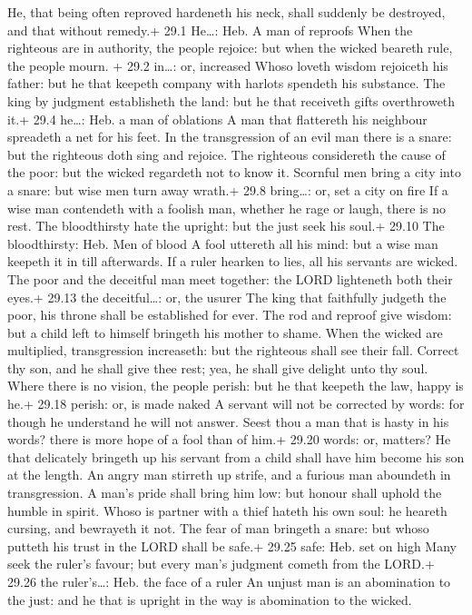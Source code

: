  He, that being often reproved hardeneth his neck, shall
suddenly be destroyed, and that without remedy.+ 29.1 He\ldots: Heb. A
man of reproofs  When the righteous are in authority, the
people rejoice: but when the wicked beareth rule, the people mourn. +
29.2 in\ldots: or, increased  Whoso loveth wisdom rejoiceth
his father: but he that keepeth company with harlots spendeth his
substance.  The king by judgment establisheth the land: but
he that receiveth gifts overthroweth it.+ 29.4 he\ldots: Heb. a man of
oblations  A man that flattereth his neighbour spreadeth a
net for his feet.  In the transgression of an evil man there
is a snare: but the righteous doth sing and rejoice.  The
righteous considereth the cause of the poor: but the wicked regardeth
not to know it.  Scornful men bring a city into a snare: but
wise men turn away wrath.+ 29.8 bring\ldots: or, set a city on fire
 If a wise man contendeth with a foolish man, whether he
rage or laugh, there is no rest.  The bloodthirsty hate the
upright: but the just seek his soul.+ 29.10 The bloodthirsty: Heb. Men
of blood  A fool uttereth all his mind: but a wise man
keepeth it in till afterwards.  If a ruler hearken to lies,
all his servants are wicked.  The poor and the deceitful
man meet together: the LORD lighteneth both their eyes.+ 29.13 the
deceitful\ldots: or, the usurer  The king that faithfully
judgeth the poor, his throne shall be established for ever.
 The rod and reproof give wisdom: but a child left to
himself bringeth his mother to shame.  When the wicked are
multiplied, transgression increaseth: but the righteous shall see their
fall.  Correct thy son, and he shall give thee rest; yea,
he shall give delight unto thy soul.  Where there is no
vision, the people perish: but he that keepeth the law, happy is he.+
29.18 perish: or, is made naked  A servant will not be
corrected by words: for though he understand he will not answer.
 Seest thou a man that is hasty in his words? there is more
hope of a fool than of him.+ 29.20 words: or, matters?  He
that delicately bringeth up his servant from a child shall have him
become his son at the length.  An angry man stirreth up
strife, and a furious man aboundeth in transgression.  A
man's pride shall bring him low: but honour shall uphold the humble in
spirit.  Whoso is partner with a thief hateth his own soul:
he heareth cursing, and bewrayeth it not.  The fear of man
bringeth a snare: but whoso putteth his trust in the LORD shall be
safe.+ 29.25 safe: Heb. set on high  Many seek the ruler's
favour; but every man's judgment cometh from the LORD.+ 29.26 the
ruler's\ldots: Heb. the face of a ruler  An unjust man is
an abomination to the just: and he that is upright in the way is
abomination to the wicked.

